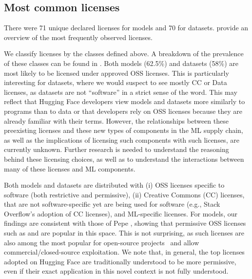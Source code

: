 \subsection{Most common licenses}
\label{sec:common_licenses}





There were 71 unique declared licenses for models and 70 for datasets. %
 provide an overview of the most frequently observed licenses. %

We classify licenses by the classes defined above. %
A breakdown of the prevalence of these classes can be found in . Both models (62.5\%) and datasets (58\%) are most likely to be licensed under approved OSS licenses. %
This is particularly interesting for datasets, where we would suspect to see mostly CC or Data licenses, as datasets are not ``software'' in a strict sense of the word. %
This may reflect that Hugging Face developers view models and datasets more similarly to programs than to data or that developers rely on OSS licenses because they are already familiar with their terms. However, the relationships between these preexisting licenses and these new types of components in the ML supply chain, as well as the implications of licensing such components with such licenses, are currently unknown. Further research is needed to understand the reasoning behind these licensing choices, as well as to understand the interactions between many of these licenses and ML components.



Both models and datasets are distributed with (i) OSS licenses specific to software (both restrictive and permissive), (ii) Creative Commons (CC) licenses, that are not software-specific yet are being used for software (e.g., Stack Overflow's adoption of CC licenses), and ML-specific licenses. For models, our findings are consistent with those of Pepe \etal  \cite{pepe2024hugging}, %
showing that permissive OSS licenses such as  and  are popular in this space. This is not surprising, as such licenses are also among the most popular for open-source projects~\cite{top_licenses,vendome2015large} 
and allow commercial/closed-source exploitation.  We note that, in general, the top licenses adopted on Hugging Face %
are traditionally understood to be more permissive, even if their exact application in this novel context is not fully understood.

